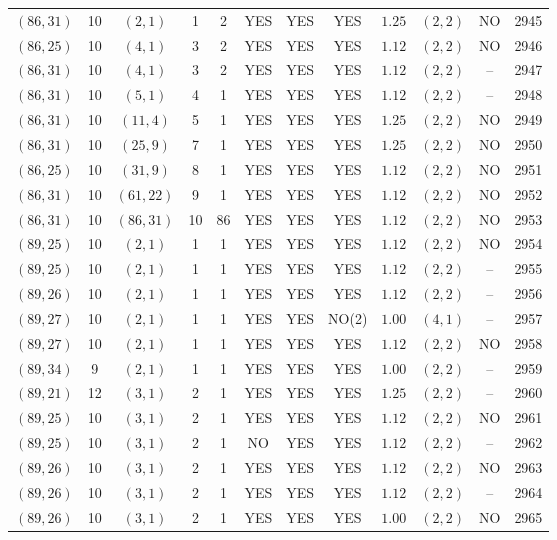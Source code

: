 \begin{longtable}{|c|c|c|c|c|c|c|c|c|c|c|c|}
$(86,31)$ & 10 & $(2,1)$ & 1 & 2 & YES & YES & YES & $1.25$ & $(2,2)$ & NO & 2945\\
$(86,25)$ & 10 & $(4,1)$ & 3 & 2 & YES & YES & YES & $1.12$ & $(2,2)$ & NO & 2946\\
$(86,31)$ & 10 & $(4,1)$ & 3 & 2 & YES & YES & YES & $1.12$ & $(2,2)$ & -- & 2947\\
$(86,31)$ & 10 & $(5,1)$ & 4 & 1 & YES & YES & YES & $1.12$ & $(2,2)$ & -- & 2948\\
$(86,31)$ & 10 & $(11,4)$ & 5 & 1 & YES & YES & YES & $1.25$ & $(2,2)$ & NO & 2949\\
$(86,31)$ & 10 & $(25,9)$ & 7 & 1 & YES & YES & YES & $1.25$ & $(2,2)$ & NO & 2950\\
$(86,25)$ & 10 & $(31,9)$ & 8 & 1 & YES & YES & YES & $1.12$ & $(2,2)$ & NO & 2951\\
$(86,31)$ & 10 & $(61,22)$ & 9 & 1 & YES & YES & YES & $1.12$ & $(2,2)$ & NO & 2952\\
$(86,31)$ & 10 & $(86,31)$ & 10 & 86 & YES & YES & YES & $1.12$ & $(2,2)$ & NO & 2953\\
$(89,25)$ & 10 & $(2,1)$ & 1 & 1 & YES & YES & YES & $1.12$ & $(2,2)$ & NO & 2954\\
$(89,25)$ & 10 & $(2,1)$ & 1 & 1 & YES & YES & YES & $1.12$ & $(2,2)$ & -- & 2955\\
$(89,26)$ & 10 & $(2,1)$ & 1 & 1 & YES & YES & YES & $1.12$ & $(2,2)$ & -- & 2956\\
$(89,27)$ & 10 & $(2,1)$ & 1 & 1 & YES & YES & NO(2) & $1.00$ & $(4,1)$ & -- & 2957\\
$(89,27)$ & 10 & $(2,1)$ & 1 & 1 & YES & YES & YES & $1.12$ & $(2,2)$ & NO & 2958\\
$(89,34)$ & 9 & $(2,1)$ & 1 & 1 & YES & YES & YES & $1.00$ & $(2,2)$ & -- & 2959\\
$(89,21)$ & 12 & $(3,1)$ & 2 & 1 & YES & YES & YES & $1.25$ & $(2,2)$ & -- & 2960\\
$(89,25)$ & 10 & $(3,1)$ & 2 & 1 & YES & YES & YES & $1.12$ & $(2,2)$ & NO & 2961\\
$(89,25)$ & 10 & $(3,1)$ & 2 & 1 & NO & YES & YES & $1.12$ & $(2,2)$ & -- & 2962\\
$(89,26)$ & 10 & $(3,1)$ & 2 & 1 & YES & YES & YES & $1.12$ & $(2,2)$ & NO & 2963\\
$(89,26)$ & 10 & $(3,1)$ & 2 & 1 & YES & YES & YES & $1.12$ & $(2,2)$ & -- & 2964\\
$(89,26)$ & 10 & $(3,1)$ & 2 & 1 & YES & YES & YES & $1.00$ & $(2,2)$ & NO & 2965\\

\end{longtable}
